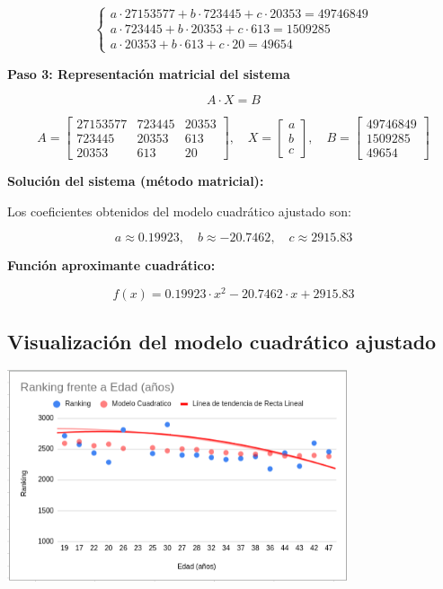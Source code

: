 \documentclass[12pt]{article}
\begin{document}
\[
\left\{
\begin{array}{l}
a \cdot 27153577 + b \cdot 723445 + c \cdot 20353 = 49746849 \\
a \cdot 723445 + b \cdot 20353 + c \cdot 613 = 1509285 \\
a \cdot 20353 + b \cdot 613 + c \cdot 20 = 49654
\end{array}
\right.
\]

\vspace{0.5cm}
\textbf{Paso 3: Representación matricial del sistema}

\[
A \cdot X = B
\]

\[
A =
\begin{bmatrix}
27153577 & 723445 & 20353 \\
723445 & 20353 & 613 \\
20353 & 613 & 20
\end{bmatrix}, \quad
X =
\begin{bmatrix}
a \\
b \\
c
\end{bmatrix}, \quad
B =
\begin{bmatrix}
49746849 \\
1509285 \\
49654
\end{bmatrix}
\]

\vspace{0.5cm}
\textbf{Solución del sistema (método matricial):}

Los coeficientes obtenidos del modelo cuadrático ajustado son:

\[
a \approx 0.19923, \quad b \approx -20.7462, \quad c \approx 2915.83
\]

\vspace{0.3cm}
\textbf{Función aproximante cuadrático:}

\[
f(x) = 0.19923 \cdot x^2 - 20.7462 \cdot x + 2915.83
\]


\vspace{1cm}
\subsection*{Visualización del modelo cuadrático ajustado}
\vspace{0.5cm}

\begin{center}
    \includegraphics[width=0.75\textwidth]{nubePolinomica.png}
\end{center}
\end{document}
